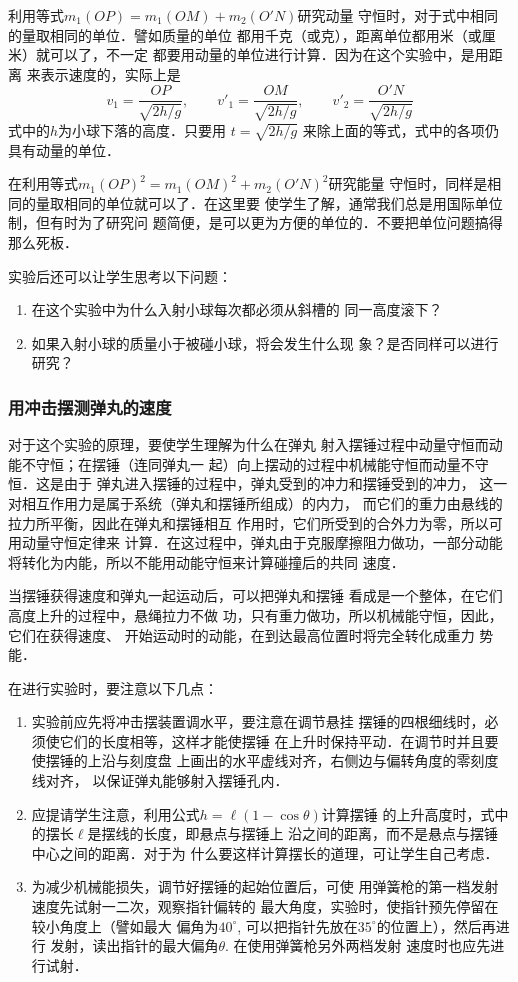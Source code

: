利用等式$m_1(OP)=m_1(OM)+m_2(O'N)$研究动量
守恒时，对于式中相同的量取相同的单位．譬如质量的单位
都用千克（或克），距离单位都用米（或厘米）就可以了，不一定
都要用动量的单位进行计算．因为在这个实验中，是用距离
来表示速度的，实际上是
\[v_1=\frac{OP}{\sqrt{2h/g}},\qquad v'_1=\frac{OM}{\sqrt{2h/g}},\qquad v'_2=\frac{O'N}{\sqrt{2h/g}}\]
式中的$h$为小球下落的高度．只要用
$t=\sqrt{2h/g}$
来除上面的等式，式中的各项仍具有动量的单位．

在利用等式$m_1(OP)^2=m_1(OM)^2+m_2(O'N)^2$研究能量
守恒时，同样是相同的量取相同的单位就可以了．在这里要
使学生了解，通常我们总是用国际单位制，但有时为了研究问
题简便，是可以更为方便的单位的．不要把单位问题搞得
那么死板．

实验后还可以让学生思考以下问题：
\begin{enumerate}
\item 在这个实验中为什么入射小球每次都必须从斜槽的
同一高度滚下？
\item 如果入射小球的质量小于被碰小球，将会发生什么现
象？是否同样可以进行研究？
\end{enumerate}

\subsubsection{用冲击摆测弹丸的速度}

对于这个实验的原理，要使学生理解为什么在弹丸
射入摆锤过程中动量守恒而动能不守恒；在摆锤（连同弹丸一
起）向上摆动的过程中机械能守恒而动量不守恒．这是由于
弹丸进入摆锤的过程中，弹丸受到的冲力和摆锤受到的冲力，
这一对相互作用力是属于系统（弹丸和摆锤所组成）的内力，
而它们的重力由悬线的拉力所平衡，因此在弹丸和摆锤相互
作用时，它们所受到的合外力为零，所以可用动量守恒定律来
计算．在这过程中，弹丸由于克服摩擦阻力做功，一部分动能
将转化为内能，所以不能用动能守恒来计算碰撞后的共同
速度．

当摆锤获得速度和弹丸一起运动后，可以把弹丸和摆锤
看成是一个整体，在它们高度上升的过程中，悬绳拉力不做
功，只有重力做功，所以机械能守恒，因此，它们在获得速度、
开始运动时的动能，在到达最高位置时将完全转化成重力
势能．

在进行实验时，要注意以下几点：
\begin{enumerate}
\item 实验前应先将冲击摆装置调水平，要注意在调节悬挂
摆锤的四根细线时，必须使它们的长度相等，这样才能使摆锤
在上升时保持平动．在调节时并且要使摆锤的上沿与刻度盘
上画出的水平虚线对齐，右侧边与偏转角度的零刻度线对齐，
以保证弹丸能够射入摆锤孔内．
\item 应提请学生注意，利用公式$h=\ell(1-\cos\theta)$计算摆锤
的上升高度时，式中的摆长$\ell$是摆线的长度，即悬点与摆锤上
沿之间的距离，而不是悬点与摆锤中心之间的距离．对于为
什么要这样计算摆长的道理，可让学生自己考虑．
\item 为减少机械能损失，调节好摆锤的起始位置后，可使
用弹簧枪的第一档发射速度先试射一二次，观察指针偏转的
最大角度，实验时，使指针预先停留在较小角度上（譬如最大
偏角为$40^{\circ}$, 可以把指针先放在$35^{\circ}$的位置上），然后再进行
发射，读出指针的最大偏角$\theta$. 在使用弹簧枪另外两档发射
速度时也应先进行试射．
\end{enumerate}

